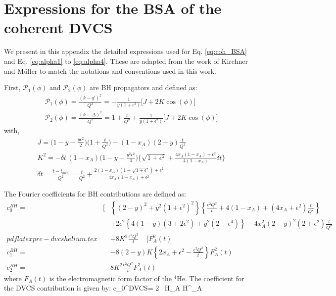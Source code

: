 \documentclass{article}
\let\oldequation\equation
\let\oldendequation\endequation
\renewenvironment{equation}
  {\linenomathNonumbers\oldequation}
  {\oldendequation\endlinenomath}
\begin{document}
\appendix
\section{Expressions for the BSA of the coherent DVCS}
\label{sec:eq}

We present in this appendix the detailed expressions used for Eq. \ref{eq:coh_BSA} 
and Eq. \ref{eq:alpha1} to \ref{eq:alpha4}. These are adapted from the work of 
Kirchner and Müller \cite{Kirchner:2003wt} to match the notations and conventions used
in this work.
	
First, $\mathcal{P}_{1}(\phi)$ and $\mathcal{P}_{2}(\phi)$ are BH propagators and defined as:
\begin{align}
&\mathcal{P}_{1}(\phi) = \frac{(k - q')^{2}}{Q^{2}} = - \frac{1}{y (1 + \epsilon^{2})} 
\big[ J + 2 K \cos(\phi) \big] \\
&\mathcal{P}_{2}(\phi) = \frac{(k - \Delta)^{2}}{Q^{2}} = 1 + \frac{t}{Q^{2}} + 
\frac{1}{y (1 + \epsilon^{2})} \big[ J + 2 K \cos(\phi) \big]
\end{align}
with,
\begin{align}
& J = \bigg( 1 - y - \frac{y \epsilon^{2}}{2} \bigg) \bigg(1 + \frac{t}{Q^{2}} \bigg) - 
(1 - x_{A})(2 - y) \frac{t}{Q^{2}} \\
& K^{2} = - \delta t \, (1 - x_{A}) \bigg( 1 - y - \frac{y^{2} \epsilon^{2}}{4} \bigg) 
\bigg\{ \sqrt{1 + \epsilon^{2}} + \frac{4 x_{A} (1-x_{A}) + \epsilon^{2}}{4 (1 - x_{A})}
\delta t \bigg\} \\
& \delta t = \frac{t - t_{min}}{Q^{2}} = \frac{t}{Q^{2}} + \frac{2(1-x_{A}) \left(1- \sqrt{1 + 
\epsilon^{2}} \right) + \epsilon^{2}}{4 x_{A} (1- x_{A}) + \epsilon^{2}}.
\end{align}

The Fourier coefficients for BH contributions are defined as:
\begin{eqnarray}
c_0^{BH} = & \bigg[ & \left\{ {(2-y)}^2 + y^2{(1+\epsilon^2)}^2 \right\} 
\left\{ \frac{\epsilon^2 Q^2}{t} + 4 (1-x_A) + (4x_A+\epsilon^2) \frac{t}{Q^2} 
\right\} \nonumber \\
& \phantom{\bigg[} & + 2 \epsilon^2 \left\{ 4(1-y)(3+2\epsilon^2) + y^2(2-\epsilon^4) 
\right\} - 4 x_A^2{(2-y)}^2 (2+\epsilon^2) \frac{t}{Q^2} \nonumber \\
pdflatex prc-dvcshelium.tex
& \phantom{\bigg[} & + 8 K^2 \frac{\epsilon^2 Q^2}{t} \,\,\,\,\,\,\, \bigg] F_A^2(t)  \\
c_1^{BH} = & \phantom{\bigg[} & -8 (2-y) K \left\{ 2 x_A + \epsilon^2 - 
\frac{\epsilon^2 Q^2}{t} \right\} F_A^2(t)  \\
c_2^{BH} = & \phantom{\bigg[} & 8 K^2 \frac{\epsilon^2 Q^2}{t} F_A^2(t) 
\end{eqnarray} 
where $F_A(t)$ is the electromagnetic form factor of the $^4$He. 
The coefficient for the DVCS contribution is given by: 
\begin{equation}
   c_0^{DVCS}= 2  \, 
   {\mathcal H}_A {\mathcal H}^{\star}_A 
   \label{eq:c0DVCS}
\end{equation}
\end{document}
